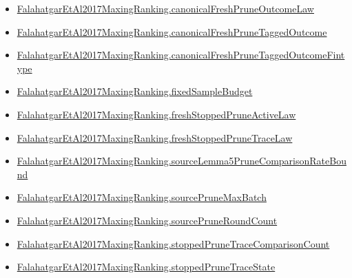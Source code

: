 \documentclass[10pt]{article}
\begin{document}
\begin{itemize}
\item \hyperlink{governing-declaration-2d276a1a3b14a7e3}{Falahatgar\allowbreak{}Et\allowbreak{}Al2017\allowbreak{}Maxing\allowbreak{}Ranking.\allowbreak{}canonical\allowbreak{}Fresh\allowbreak{}Prune\allowbreak{}Outcome\allowbreak{}Law}
\item \hyperlink{governing-declaration-3a0933a8178fc16e}{Falahatgar\allowbreak{}Et\allowbreak{}Al2017\allowbreak{}Maxing\allowbreak{}Ranking.\allowbreak{}canonical\allowbreak{}Fresh\allowbreak{}Prune\allowbreak{}Tagged\allowbreak{}Outcome}
\item \hyperlink{governing-declaration-6e0ce93b44515012}{Falahatgar\allowbreak{}Et\allowbreak{}Al2017\allowbreak{}Maxing\allowbreak{}Ranking.\allowbreak{}canonical\allowbreak{}Fresh\allowbreak{}Prune\allowbreak{}Tagged\allowbreak{}Outcome\allowbreak{}Fintype}
\item \hyperlink{governing-declaration-4b4daf4bb2493573}{Falahatgar\allowbreak{}Et\allowbreak{}Al2017\allowbreak{}Maxing\allowbreak{}Ranking.\allowbreak{}fixed\allowbreak{}Sample\allowbreak{}Budget}
\item \hyperlink{governing-declaration-5f776e500737d941}{Falahatgar\allowbreak{}Et\allowbreak{}Al2017\allowbreak{}Maxing\allowbreak{}Ranking.\allowbreak{}fresh\allowbreak{}Stopped\allowbreak{}Prune\allowbreak{}Active\allowbreak{}Law}
\item \hyperlink{governing-declaration-e752b639257064f7}{Falahatgar\allowbreak{}Et\allowbreak{}Al2017\allowbreak{}Maxing\allowbreak{}Ranking.\allowbreak{}fresh\allowbreak{}Stopped\allowbreak{}Prune\allowbreak{}Trace\allowbreak{}Law}
\item \hyperlink{governing-declaration-dac2c682a1bccd41}{Falahatgar\allowbreak{}Et\allowbreak{}Al2017\allowbreak{}Maxing\allowbreak{}Ranking.\allowbreak{}source\allowbreak{}Lemma5\allowbreak{}Prune\allowbreak{}Comparison\allowbreak{}Rate\allowbreak{}Bound}
\item \hyperlink{governing-declaration-753e8447dfb04151}{Falahatgar\allowbreak{}Et\allowbreak{}Al2017\allowbreak{}Maxing\allowbreak{}Ranking.\allowbreak{}source\allowbreak{}Prune\allowbreak{}Max\allowbreak{}Batch}
\item \hyperlink{governing-declaration-7a4a97da03826b66}{Falahatgar\allowbreak{}Et\allowbreak{}Al2017\allowbreak{}Maxing\allowbreak{}Ranking.\allowbreak{}source\allowbreak{}Prune\allowbreak{}Round\allowbreak{}Count}
\item \hyperlink{governing-declaration-35a38588d49521f4}{Falahatgar\allowbreak{}Et\allowbreak{}Al2017\allowbreak{}Maxing\allowbreak{}Ranking.\allowbreak{}stopped\allowbreak{}Prune\allowbreak{}Trace\allowbreak{}Comparison\allowbreak{}Count}
\item \hyperlink{governing-declaration-bb5991f407529737}{Falahatgar\allowbreak{}Et\allowbreak{}Al2017\allowbreak{}Maxing\allowbreak{}Ranking.\allowbreak{}stopped\allowbreak{}Prune\allowbreak{}Trace\allowbreak{}State}
\end{itemize}
\end{document}
